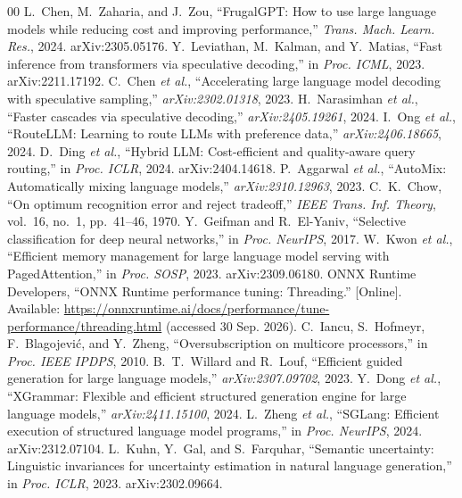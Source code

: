 \documentclass[conference]{IEEEtran}
\begin{document}
\begin{thebibliography}{00}
 L.~Chen, M.~Zaharia, and J.~Zou, ``FrugalGPT: How to use large language models while reducing cost and improving performance,'' \emph{Trans. Mach. Learn. Res.}, 2024. arXiv:2305.05176.
 Y.~Leviathan, M.~Kalman, and Y.~Matias, ``Fast inference from transformers via speculative decoding,'' in \emph{Proc. ICML}, 2023. arXiv:2211.17192.
 C.~Chen \emph{et al.}, ``Accelerating large language model decoding with speculative sampling,'' \emph{arXiv:2302.01318}, 2023.
 H.~Narasimhan \emph{et al.}, ``Faster cascades via speculative decoding,'' \emph{arXiv:2405.19261}, 2024.
 I.~Ong \emph{et al.}, ``RouteLLM: Learning to route LLMs with preference data,'' \emph{arXiv:2406.18665}, 2024.
 D.~Ding \emph{et al.}, ``Hybrid LLM: Cost-efficient and quality-aware query routing,'' in \emph{Proc. ICLR}, 2024. arXiv:2404.14618.
 P.~Aggarwal \emph{et al.}, ``AutoMix: Automatically mixing language models,'' \emph{arXiv:2310.12963}, 2023.
 C.~K.~Chow, ``On optimum recognition error and reject tradeoff,'' \emph{IEEE Trans. Inf. Theory}, vol.~16, no.~1, pp.~41--46, 1970.
 Y.~Geifman and R.~El-Yaniv, ``Selective classification for deep neural networks,'' in \emph{Proc. NeurIPS}, 2017.
 W.~Kwon \emph{et al.}, ``Efficient memory management for large language model serving with PagedAttention,'' in \emph{Proc. SOSP}, 2023. arXiv:2309.06180.
 ONNX Runtime Developers, ``ONNX Runtime performance tuning: Threading.'' [Online]. Available: \url{https://onnxruntime.ai/docs/performance/tune-performance/threading.html} (accessed 30 Sep. 2026).
 C.~Iancu, S.~Hofmeyr, F.~Blagojevi\'c, and Y.~Zheng, ``Oversubscription on multicore processors,'' in \emph{Proc. IEEE IPDPS}, 2010.
 B.~T.~Willard and R.~Louf, ``Efficient guided generation for large language models,'' \emph{arXiv:2307.09702}, 2023.
 Y.~Dong \emph{et al.}, ``XGrammar: Flexible and efficient structured generation engine for large language models,'' \emph{arXiv:2411.15100}, 2024.
 L.~Zheng \emph{et al.}, ``SGLang: Efficient execution of structured language model programs,'' in \emph{Proc. NeurIPS}, 2024. arXiv:2312.07104.
 L.~Kuhn, Y.~Gal, and S.~Farquhar, ``Semantic uncertainty: Linguistic invariances for uncertainty estimation in natural language generation,'' in \emph{Proc. ICLR}, 2023. arXiv:2302.09664.

\end{thebibliography}
\end{document}
